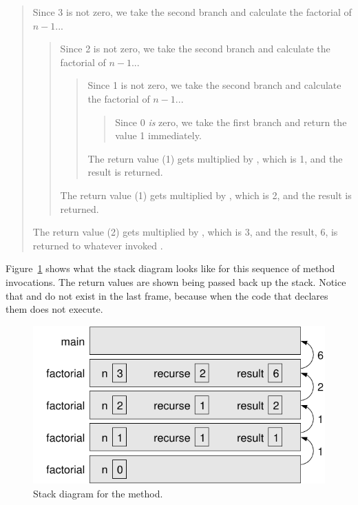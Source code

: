 \vspace{-1ex}
\begin{quote}
Since 3 is not zero, we take the second branch and calculate the factorial of $n-1$...
\begin{quote}
Since 2 is not zero, we take the second branch and calculate the factorial of $n-1$...
\begin{quote}
Since 1 is not zero, we take the second branch and calculate the factorial of $n-1$...
\begin{quote}
Since 0 {\em is} zero, we take the first branch and return the value 1 immediately.
\end{quote}
The return value (1) gets multiplied by , which is 1, and the result is returned.
\end{quote}
The return value (1) gets multiplied by , which is 2, and the result is returned.
\end{quote}
The return value (2) gets multiplied by , which is 3, and the result, 6, is returned to whatever invoked .
\end{quote}
\vspace{-1ex}


Figure~\ref{fig.stack3} shows what the stack diagram looks like for this sequence of method invocations.
The return values are shown being passed back up the stack.
Notice that  and  do not exist in the last frame, because when  the code that declares them does not execute.

\begin{figure}[!ht]
\begin{center}
\includegraphics{figs/stack3.pdf}
\caption{Stack diagram for the  method.}
\label{fig.stack3}
\end{center}
\end{figure}


